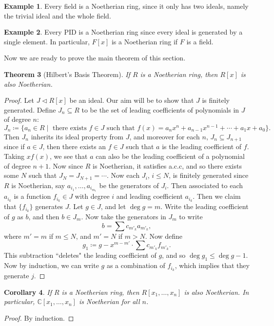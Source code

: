 \documentclass[letterpaper]{article}
\newtheorem{theorem}{Theorem}[section]
\newtheorem{corollary}[theorem]{Corollary}
\theoremstyle{definition}
\newtheorem{example}[theorem]{Example}
\theoremstyle{remark}
\newcommand\CC{\mathbb{C}}
\newcommand{\defeq}{\coloneqq}
\newcommand{\ideal}{\vartriangleleft}
\begin{document}
\begin{example}
    Every field is a Noetherian ring, since it only has two ideals, namely the trivial ideal and the whole field. 
\end{example}
\begin{example}
    Every PID is a Noetherian ring since every ideal is generated by a single element. In particular, $F[x]$ is a Noetherian ring if $F$ is a field.
\end{example}
Now we are ready to prove the main theorem of this section. \begin{theorem}[Hilbert's Basis Theorem]
    If $R$ is a Noetherian ring, then $R[x]$ is also Noetherian. 
\end{theorem}
\begin{proof}
    Let $J\ideal R[x]$ be an ideal. Our aim will be to show that $J$ is finitely generated. Define $J_n\subseteq R$ to be the set of leading coefficients of polynomials in $J$ of degree $n$: \[J_n\defeq \{a_n\in R\mid\text{ there exists }f \in J \text{ such that }f(x)= a_nx^n+a_{n-1}x^{n-1}+\cdots+a_1x+a_0\}.\] Then $J_n$ inherits its ideal property from $J$, and moreover for each $n$, $J_n\subseteq J_{n+1}$ since if $a\in J$, then there exists an $f\in J$ such that $a$ is the leading coefficient of $f$. Taking $xf(x)$, we see that $a$ can also be the leading coefficient of a polynomial of degree $n+1$. Now since $R$ is Noetherian, it satisfies a.c.c, and so there exists some $N$ such that $J_N=J_{N+1}=\cdots$. Now each $J_i$, $i\le N$, is finitely generated since $R$ is Noetherian, say $a_{i_1},\dots,a_{i_{m_1}}$ be the generators of $J_{i}$. Then associated to each $a_{i_k}$ is a function $f_{i_k}\in J$ with degree $i$ and leading coefficient $a_{i_k}$. Then we claim that $\{f_{i_k}\}$ generates $J$. Let $g\in J$, and let $\deg g=m$. Write the leading coefficient of $g$ as $b$, and then $b\in J_m$. Now take the generators in $J_m$ to write \[b=\sum c_{m'_k}a_{m'_k},\] where $m'=m$ if $m\le N$, and $m'=N$ if $m>N$. Now define \[g_1\defeq g-x^{m-m'}\cdot \sum c_{m'_k}f_{m'_k}.   \] This subtraction ``deletes" the leading coefficient of $g$, and so $\deg g_1\le \deg g-1$. Now by induction, we can write $g$ as a combination of $f_{i_k}$, which implies that they generate $j$. 
\end{proof}
\begin{corollary}\label{cor3.6}
    If $R$ is a Noetherian ring, then $R[x_1,\dots,x_n]$ is also Noetherian. In particular, $\CC[x_1,\dots,x_n]$ is Noetherian for all $n$. 
\end{corollary}
\begin{proof}
    By induction.
\end{proof}
\end{document}
